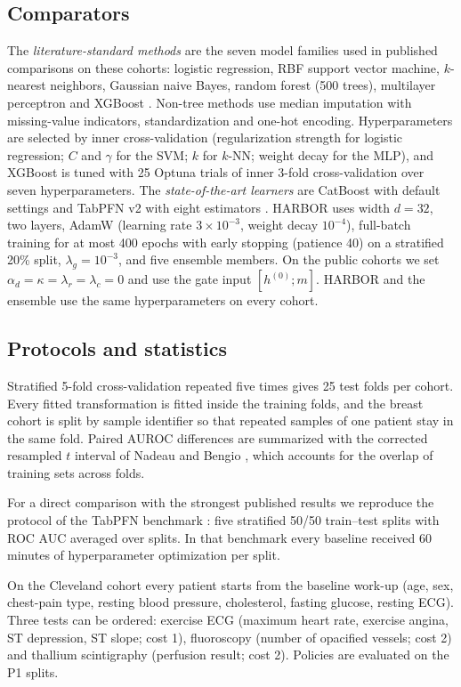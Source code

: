 \subsection{Comparators}
The \emph{literature-standard methods} are the seven model families used in published comparisons on these cohorts: logistic regression, RBF support vector machine, $k$-nearest neighbors, Gaussian naive Bayes, random forest (500 trees), multilayer perceptron and XGBoost \cite{xgboost}. Non-tree methods use median imputation with missing-value indicators, standardization and one-hot encoding. Hyperparameters are selected by inner cross-validation (regularization strength for logistic regression; $C$ and $\gamma$ for the SVM; $k$ for $k$-NN; weight decay for the MLP), and XGBoost is tuned with 25 Optuna \cite{optuna} trials of inner 3-fold cross-validation over seven hyperparameters. The \emph{state-of-the-art learners} are CatBoost with default settings \cite{catboost} and TabPFN v2 with eight estimators \cite{tabpfn2}. HARBOR uses width $d=32$, two layers, AdamW (learning rate $3\times10^{-3}$, weight decay $10^{-4}$), full-batch training for at most 400 epochs with early stopping (patience 40) on a stratified 20\% split, $\lambda_g=10^{-3}$, and five ensemble members. On the public cohorts we set $\alpha_d=\kappa=\lambda_r=\lambda_c=0$ and use the gate input $[h^{(0)};m]$. HARBOR and the ensemble use the same hyperparameters on every cohort.

\subsection{Protocols and statistics}
Stratified 5-fold cross-validation repeated five times gives 25 test folds per cohort. Every fitted transformation is fitted inside the training folds, and the breast cohort is split by sample identifier so that repeated samples of one patient stay in the same fold. Paired AUROC differences are summarized with the corrected resampled $t$ interval of Nadeau and Bengio \cite{nadeau2003}, which accounts for the overlap of training sets across folds.

For a direct comparison with the strongest published results we reproduce the protocol of the TabPFN benchmark \cite{tabpfn}: five stratified 50/50 train--test splits with ROC AUC averaged over splits. In that benchmark every baseline received 60 minutes of hyperparameter optimization per split.

On the Cleveland cohort every patient starts from the baseline work-up (age, sex, chest-pain type, resting blood pressure, cholesterol, fasting glucose, resting ECG). Three tests can be ordered: exercise ECG (maximum heart rate, exercise angina, ST depression, ST slope; cost 1), fluoroscopy (number of opacified vessels; cost 2) and thallium scintigraphy (perfusion result; cost 2). Policies are evaluated on the P1 splits.

